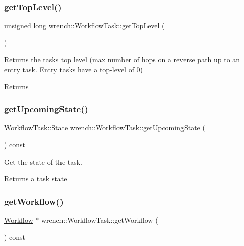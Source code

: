 \subsubsection{\texorpdfstring{get\+Top\+Level()}{getTopLevel()}}
{\footnotesize\ttfamily unsigned long wrench\+::\+Workflow\+Task\+::get\+Top\+Level (\begin{DoxyParamCaption}{ }\end{DoxyParamCaption})}



Returns the task\textquotesingle{}s top level (max number of hops on a reverse path up to an entry task. Entry tasks have a top-\/level of 0) 

\begin{DoxyReturn}{Returns}

\end{DoxyReturn}
\mbox{\label{classwrench_1_1_workflow_task_acb8706e0b3d3d7457300f698cab24ef7}} 
\subsubsection{\texorpdfstring{get\+Upcoming\+State()}{getUpcomingState()}}
{\footnotesize\ttfamily \hyperlink{classwrench_1_1_workflow_task_a1184f3d7aea21e1c87a9b17e84f1f92a}{Workflow\+Task\+::\+State} wrench\+::\+Workflow\+Task\+::get\+Upcoming\+State (\begin{DoxyParamCaption}{ }\end{DoxyParamCaption}) const}



Get the state of the task. 

\begin{DoxyReturn}{Returns}
a task state 
\end{DoxyReturn}
\mbox{\label{classwrench_1_1_workflow_task_aea29ebd47e1e3a1b955fafc0e72dff50}} 
\subsubsection{\texorpdfstring{get\+Workflow()}{getWorkflow()}}
{\footnotesize\ttfamily \hyperlink{classwrench_1_1_workflow}{Workflow} $\ast$ wrench\+::\+Workflow\+Task\+::get\+Workflow (\begin{DoxyParamCaption}{ }\end{DoxyParamCaption}) const}



